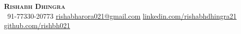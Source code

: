 \begin{center}
    \textbf{\Huge \scshape Rishabh Dhingra} \\ \vspace{1pt}
     \ \small 91-77330-20773 \quad
    \href{mailto:rishabharora021@gmail.com}{ \underline{rishabharora021@gmail.com}} \quad
    \href{https://www.linkedin.com/in/rishabhdhingra21}{ \underline{linkedin.com/rishabhdhingra21}} \quad
    \href{https://github.com/rishbh021}{ \underline{github.com/rishbh021}}
\end{center}